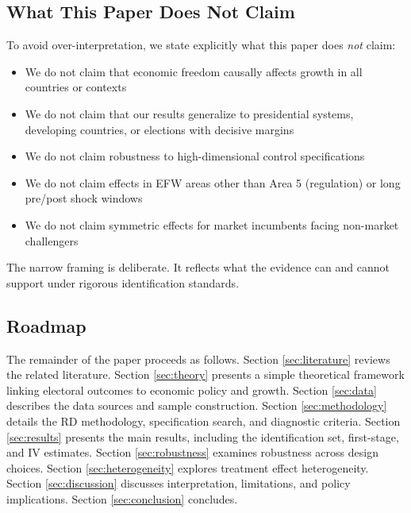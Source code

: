 \documentclass[12pt,a4paper]{article}
\begin{document}
\subsection{What This Paper Does Not Claim}

To avoid over-interpretation, we state explicitly what this paper does 
\textit{not} claim:
%
\begin{itemize}[noitemsep]
    \item We do not claim that economic freedom causally affects growth 
    in all countries or contexts
    \item We do not claim that our results generalize to presidential 
    systems, developing countries, or elections with decisive margins
    \item We do not claim robustness to high-dimensional control specifications
    \item We do not claim effects in EFW areas other than Area 5 (regulation) 
    or long pre/post shock windows
    \item We do not claim symmetric effects for market incumbents facing 
    non-market challengers
\end{itemize}
%
The narrow framing is deliberate. It reflects what the evidence can and 
cannot support under rigorous identification standards.

\subsection{Roadmap}

The remainder of the paper proceeds as follows. Section \ref{sec:literature} 
reviews the related literature. Section \ref{sec:theory} presents a simple 
theoretical framework linking electoral outcomes to economic policy and 
growth. Section \ref{sec:data} describes the data sources and sample 
construction. Section \ref{sec:methodology} details the RD methodology, 
specification search, and diagnostic criteria. Section \ref{sec:results} 
presents the main results, including the identification set, first-stage, 
and IV estimates. Section \ref{sec:robustness} examines robustness across 
design choices. Section \ref{sec:heterogeneity} explores treatment effect 
heterogeneity. Section \ref{sec:discussion} discusses interpretation, 
limitations, and policy implications. Section \ref{sec:conclusion} concludes.

\end{document}
